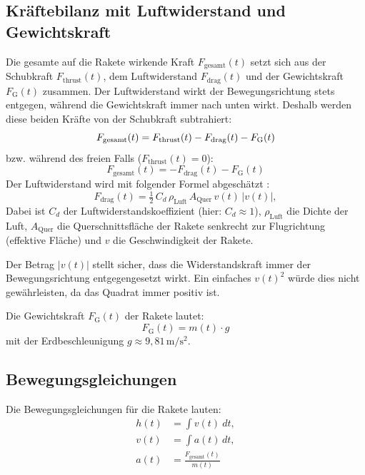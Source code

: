 \documentclass{SimSemBericht} %
\begin{document}
\subsection{Kräftebilanz mit Luftwiderstand und Gewichtskraft}
Die gesamte auf die Rakete wirkende Kraft \(F_{\text{gesamt}}(t)\) setzt sich aus der Schubkraft \(F_{\text{thrust}}(t)\), dem Luftwiderstand \(F_{\text{drag}}(t)\) und der Gewichtskraft \(F_{\text{G}}(t)\) zusammen. 
Der Luftwiderstand wirkt der Bewegungsrichtung stets entgegen, während die Gewichtskraft immer nach unten wirkt. Deshalb werden diese beiden Kräfte von der Schubkraft subtrahiert:
\begin{equation}
F_{\text{gesamt}}(t) = F_{\text{thrust}}(t) - F_{\text{drag}}(t) - F_{\text{G}}(t)\\[4pt]
\end{equation}
bzw. während des freien Falls (\(F_{\text{thrust}}(t) = 0\)):
\begin{equation}
F_{\text{gesamt}}(t) = - F_{\text{drag}}(t) - F_{\text{G}}(t)
\end{equation}
Der Luftwiderstand wird mit folgender Formel abgeschätzt \cite{formelsammlung2024}: %
\begin{equation}
F_{\text{drag}}(t) = \tfrac{1}{2}\,C_d \,\rho_{\mathrm{Luft}} \,A_{\text{Quer}}\, v(t)\,|v(t)|,
\end{equation}
Dabei ist \(C_d\) der Luftwiderstandskoeffizient (hier: \(C_d \approx 1\)), \(\rho_{\mathrm{Luft}}\) die Dichte der Luft, \(A_{\text{Quer}}\) die Querschnittsfläche der Rakete senkrecht zur Flugrichtung (effektive Fläche) und \(v\) die Geschwindigkeit der Rakete.

Der Betrag \( |v(t)| \) stellt sicher, dass die Widerstandskraft immer der Bewegungsrichtung entgegengesetzt wirkt. Ein einfaches \(v(t)^2\) würde dies nicht gewährleisten, da das Quadrat immer positiv ist.

Die Gewichtskraft \(F_{\text{G}}(t)\) der Rakete lautet:
\begin{equation}
F_{\text{G}}(t) = m(t) \cdot g
\end{equation}
mit der Erdbeschleunigung \(g \approx 9{,}81\,\mathrm{m/s^2}\).
\subsection{Bewegungsgleichungen}
Die Bewegungsgleichungen für die Rakete lauten:
\begin{align}
    h(t) &= \int v(t) \ dt,\\[6pt]
    v(t) &= \int a(t) \, dt,\\[6pt]
    a(t) &= \frac{F_{\text{gesamt}}(t)}{m(t)}
\end{align}
\end{document}
